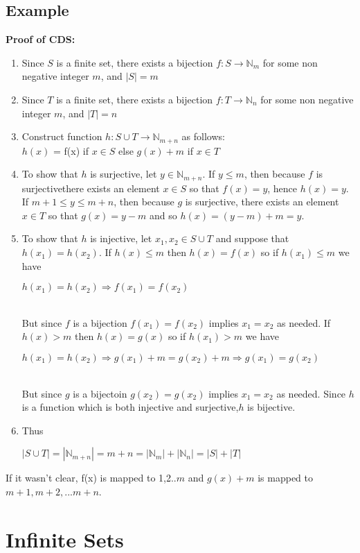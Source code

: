 \documentclass[12pt]{report}
\begin{document}
		\subsection{Example}
			\textbf{Proof of CDS:}
			\begin{enumerate}
				\item Since $S$ is a finite set, there exists a bijection $f:S \rightarrow \mathbb{N}_m$ for some non negative integer $m$, and $|S| = m$
				\item Since $T$ is a finite set, there exists a bijection $f:T \rightarrow \mathbb{N}_n$ for some non negative integer $m$, and $|T| = n$
				\item Construct function $h:S \cup T \rightarrow \mathbb{N}_{m+n}$ as follows: \\
				$h(x)$ = f(x) if $x \in S$ else $g(x) + m$ if $x \in T$
				\item To show that $h$ is surjective, let $y \in \mathbb{N}_{m+n}$. If $y \leq m$, then because $f$ is surjectivethere exists an element $x \in S$ so that $f(x) = y$, hence $h(x) = y$. If $m+1 \leq y \leq m + n$, then because $g$ is surjective, there exists an element $x \in T$ so that $g(x) = y-m$ and so $h(x) = (y-m) + m = y$.
				\item To show that $h$ is injective, let $x_1, x_2 \in S \cup T$ and suppose that $h(x_1) = h(x_2)$. If $h(x) \leq m$ then $h(x) = f(x)$ so if $h(x_1) \leq m$ we have\\
				\centerline{$h(x_1) = h(x_2) \Rightarrow f(x_1) = f(x_2)$} \\
				But since $f$ is a bijection $f(x_1) = f(x_2)$ implies $x_1 = x_2$ as needed. If $h(x) > m$ then $h(x) = g(x)$ so if $h(x_1) > m$ we have \\
				\centerline{$h(x_1) = h(x_2) \Rightarrow g(x_1) + m = g(x_2) + m \Rightarrow g(x_1) = g(x_2)$} \\
				But since $g$ is a bijectoin $g(x_2) = g(x_2) $ implies $x_1 = x_2$ as needed. Since $h$ is a function which is both injective and surjective,$h$ is bijective.
				\item Thus \\
				\centerline{$|S \cup T| = |\mathbb{N}_{m+n}| = m+n=|\mathbb{N}_m| + |\mathbb{N}_n| = |S| + |T|$}
			\end{enumerate}
			If it wasn't clear, f(x) is mapped to 1,2..$m$ and $g(x) + m$ is mapped to $m+1, m+2,$...$m+n$.
	\section{Infinite Sets}
\end{document}
